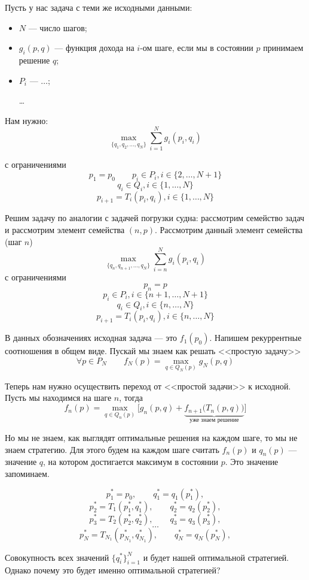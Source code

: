 Пусть у нас задача с теми же исходными данными:

\begin{itemize}
	\item $N$ --- число шагов;
	
	\item $g_i(p, q)$ --- функция дохода на $i$-ом шаге, если мы в состоянии $p$ принимаем решение $q$;
	
	\item $P_i$ --- $\dots$;
	
	\dots
\end{itemize}

Нам нужно:
\[
\max_{\{q_1, q_2, \dots, q_N\}} \sum_{i=1}^{N} g_i(p_i, q_i)
\]

с ограничениями
\[
p_1 = p_0 \qquad p_i \in P_i, i \in \{2, \dots, N+1\}
\]
\[
q_i \in Q_i, i \in \{1, \dots, N\}
\]
\[
p_{i+1} = T_i(p_i, q_i), i \in \{1, \dots, N\}
\]

Решим задачу по аналогии с задачей погрузки судна: рассмотрим семейство задач и рассмотрим элемент семейства $(n, p)$. Рассмотрим данный элемент семейства (шаг $n$)
\[
\max_{\{q_n, q_{n+1}, \dots, q_N\}} \sum_{i=n}^{N} g_i(p_i, q_i)
\]
с ограничениями
\[
p_n = p
\]
\[
p_i \in P_i, i \in \{n+1, \dots, N+1\}
\]
\[
q_i \in Q_i, i \in \{n, \dots, N\}
\]
\[
p_{i+1} = T_i(p_i, q_i), i \in \{n, \dots, N\}
\]

В данных обозначениях исходная задача --- это $f_1(p_0)$. Напишем рекуррентные соотношения в общем виде. Пускай мы знаем как решать <<простую задачу>>
\[
\forall p \in P_{N} \qquad f_N(p) = \max_{q \in Q_{N}(p)} g_N(p, q)
\]

Теперь нам нужно осуществить переход от <<простой задачи>> к исходной. Пусть мы находимся на шаге $n$, тогда
\[
f_n(p) = \max_{q \in Q_{n}(p)} \Big[g_n(p, q) + \underbrace{f_{n+1}\big(T_{n}(p, q)\big)}_{\text{уже знаем решение}}\Big]
\]

Но мы не знаем, как выглядят оптимальные решения на каждом шаге, то мы не знаем стратегию. Для этого будем на каждом шаге считать $f_n(p)$ и $q_n(p)$ --- значение $q$, на котором достигается максимум в состоянии $p$. Это значение запоминаем.

\[
p_1^* = p_0, \qquad q_1^* = q_1(p_1^*),
\]
\[
p_2^* = T_1(p_1^*, q_1^*), \qquad q_2^* = q_2(p_2^*),
\]
\[
p_3^* = T_2(p_2^*, q_2^*), \qquad q_3^* = q_3(p_3^*),
\]
\[
\dots
\]
\[
p_N^* = T_{N_1}(p_{N_1}^*, q_{N_1}^*), \qquad q_N^* = q_N(p_N^*),
\]

Совокупность всех значений $\{q_i^*\}_{i=1}^{N}$ и будет нашей оптимальной стратегией. Однако почему это будет именно оптимальной стратегией?


